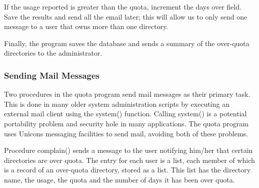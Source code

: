 If the usage reported is greater than the quota, increment the
{\textquotedbl}days over{\textquotedbl} field. Save the results and
send all the email later; this will allow us to only send one message
to a user that owns more than one directory. 


Finally, the program saves the database and sends a summary of the
over-quota directories to the administrator. 


\subsubsection{Sending Mail Messages}
Two procedures in the quota program send mail messages as their primary
task. This is done in many older system administration scripts by
executing an external mail client using the \textsf{system()} function.
Calling \textsf{system()} is a potential portability
problem and security hole in many applications. The quota program uses
Unicon{\textquotesingle}s messaging facilities to send mail, avoiding
both of these problems.

Procedure \textsf{complain()} sends a message to the user notifying
him/her that certain directories are over quota. The entry for each
user is a list, each member of which is a record of an over-quota
directory, stored as a list. This list has the directory name, the
usage, the quota and the number of days it has been over quota.

